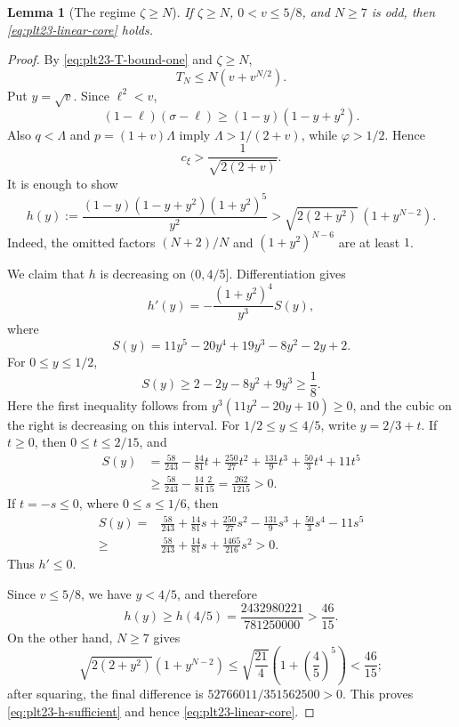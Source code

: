 \documentclass[11pt]{article}
\newtheorem{lemma}[theorem]{Lemma}
\numberwithin{equation}{section}
\begin{document}
\begin{lemma}[The regime $\zeta\ge N$]\label{lem:plt23-linear-high-zeta}
  If $\zeta\ge N$, $0<v\le5/8$, and $N\ge7$ is odd, then
  \eqref{eq:plt23-linear-core} holds.
\end{lemma}

\begin{proof}
  By \eqref{eq:plt23-T-bound-one} and $\zeta\ge N$,
  \begin{equation}\label{eq:plt23-T-high-zeta}
    T_N\le N(v+v^{N/2}).
  \end{equation}
  Put $y=\sqrt v$.  Since $\ell^2<v$,
  \[
    (1-\ell)(\sigma-\ell)
    \ge(1-y)(1-y+y^2).
  \]
  Also $q<\Lambda$ and $p=(1+v)\Lambda$ imply
  $\Lambda>1/(2+v)$, while $\varphi>1/2$.  Hence
  \begin{equation}\label{eq:plt23-cxi-crude}
    c_\xi>\frac{1}{\sqrt{2(2+v)}}.
  \end{equation}
  It is enough to show
  \begin{equation}\label{eq:plt23-h-sufficient}
    h(y):=
    \frac{(1-y)(1-y+y^2)(1+y^2)^5}{y^2}
    >\sqrt{2(2+y^2)}\,(1+y^{N-2}).
  \end{equation}
  Indeed, the omitted factors
  $(N+2)/N$ and $(1+y^2)^{N-6}$ are at least $1$.

  We claim that $h$ is decreasing on $(0,4/5]$.  Differentiation gives
  \[
    h'(y)=-\frac{(1+y^2)^4}{y^3}S(y),
  \]
  where
  \[
    S(y)=11y^5-20y^4+19y^3-8y^2-2y+2.
  \]
  For $0\le y\le1/2$,
  \[
    S(y)\ge2-2y-8y^2+9y^3\ge\frac{1}{8}.
  \]
  Here the first inequality follows from
  $y^3(11y^2-20y+10)\ge0$, and the cubic on the right is decreasing on this
  interval.  For $1/2\le y\le4/5$, write $y=2/3+t$.  If $t\ge0$, then $0\le t\le2/15$, and
  \begin{align*}
    S(y)&=\frac{58}{243}-\frac{14}{81}t
    +\frac{250}{27}t^2+\frac{131}{9}t^3
    +\frac{50}{3}t^4+11t^5\\
    &\ge \frac{58}{243}-\frac{14}{81}\frac{2}{15}
    =\frac{262}{1215}>0.
  \end{align*}
  If $t=-s\le0$, where $0\le s\le1/6$, then
  \begin{align*}
    S(y)={}&\frac{58}{243}+\frac{14}{81}s
    +\frac{250}{27}s^2-\frac{131}{9}s^3
    +\frac{50}{3}s^4-11s^5\\
    \ge{}&\frac{58}{243}+\frac{14}{81}s
    +\frac{1465}{216}s^2>0.
  \end{align*}
  Thus $h'\le0$.

  Since $v\le5/8$, we have $y<4/5$, and therefore
  \[
    h(y)\ge h(4/5)
    =\frac{2432980221}{781250000}>\frac{46}{15}.
  \]
  On the other hand, $N\ge7$ gives
  \[
    \sqrt{2(2+y^2)}(1+y^{N-2})
    \le\sqrt{\frac{21}{4}}
    \left(1+\left(\frac{4}{5}\right)^5\right)
    <\frac{46}{15};
  \]
  after squaring, the final difference is
  $52766011/351562500>0$.  This proves
  \eqref{eq:plt23-h-sufficient} and hence \eqref{eq:plt23-linear-core}.
\end{proof}
\end{document}
